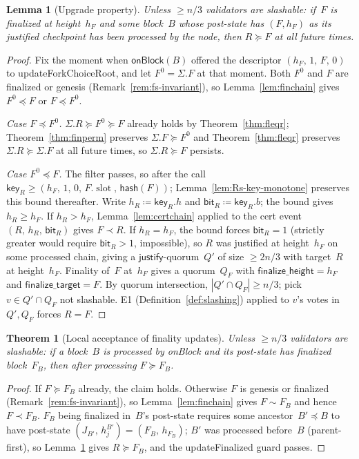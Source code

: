 \documentclass{article}
\newcommand{\slot}[0]{\ensuremath{\operatorname{\mathrm{slot}}}}
\newcommand{\just}{\ensuremath{\mathsf{justify}}\xspace}
\newcommand{\finalizeHeight}{\mathsf{finalize\_height}}
\newcommand{\finalizeTarget}{\mathsf{finalize\_target}}
\newcommand{\hash}{\mathsf{hash}}
\newcommand{\key}{\mathsf{key}}
\newcommand{\bit}{\mathsf{bit}}
\newcommand{\onBlock}{\textsf{onBlock}\xspace}
\newcommand{\updateForkChoiceRoot}{\textsf{updateForkChoiceRoot}\xspace}
\newcommand{\updateFinalized}{\textsf{updateFinalized}\xspace}
\theoremstyle{plain}
\newtheorem{theorem}{Theorem}
\newtheorem{lemma}{Lemma}
\theoremstyle{definition}
\theoremstyle{remark}
\begin{document}
\begin{lemma}[Upgrade property]\label{lem:upgrade}
Unless $\geq n/3$ validators are slashable: if~$F$ is finalized at height~$h_F$ and some block~$B$ whose post-state has $(F, h_F)$ as its justified checkpoint has been processed by the node, then $R \succeq F$ at all future times.
\end{lemma}

\begin{proof}
Fix the moment when $\onBlock(B)$ offered the descriptor $(h_F,\, 1,\, F,\, 0)$ to \updateForkChoiceRoot, and let $F^0 = \Sigma.F$ at that moment.
Both $F^0$ and $F$ are finalized or genesis (Remark~\ref{rem:fs-invariant}), so Lemma~\ref{lem:finchain} gives $F^0 \preceq F$ or $F \preceq F^0$.

\emph{Case $F \preceq F^0$.}
$\Sigma.R \succeq F^0 \succeq F$ already holds by Theorem~\ref{thm:fleqr}; Theorem~\ref{thm:finperm} preserves $\Sigma.F \succeq F^0$ and Theorem~\ref{thm:fleqr} preserves $\Sigma.R \succeq \Sigma.F$ at all future times, so $\Sigma.R \succeq F$ persists.

\emph{Case $F^0 \preceq F$.}
The filter passes, so after the call $\key_R \geq (h_F,\, 1,\, 0,\, F.\slot,\, \hash(F))$; Lemma~\ref{lem:Rs-key-monotone} preserves this bound thereafter.
Write $h_R \coloneqq \key_R.h$ and $\bit_R \coloneqq \key_R.b$; the bound gives $h_R \geq h_F$.
If $h_R > h_F$, Lemma~\ref{lem:certchain} applied to the cert event $(R,\, h_R,\, \bit_R)$ gives $F \prec R$.
If $h_R = h_F$, the bound forces $\bit_R = 1$ (strictly greater would require $\bit_R > 1$, impossible), so $R$ was justified at height~$h_F$ on some processed chain, giving a \just-quorum~$Q'$ of size $\geq 2n/3$ with target~$R$ at height~$h_F$.
Finality of~$F$ at~$h_F$ gives a quorum~$Q_F$ with $\finalizeHeight = h_F$ and $\finalizeTarget = F$.
By quorum intersection, $|Q' \cap Q_F| \geq n/3$; pick $v \in Q' \cap Q_F$ not slashable.
E1 (Definition~\ref{def:slashing}) applied to $v$'s votes in~$Q', Q_F$ forces $R = F$.
\end{proof}

\begin{theorem}[Local acceptance of finality updates]\label{thm:finlive}
Unless $\geq n/3$ validators are slashable: if a block~$B$ is processed by \onBlock and its post-state has finalized block~$F_B$, then after processing $F \succeq F_B$.
\end{theorem}

\begin{proof}
If $F \succeq F_B$ already, the claim holds.
Otherwise $F$ is genesis or finalized (Remark~\ref{rem:fs-invariant}), so Lemma~\ref{lem:finchain} gives $F \sim F_B$ and hence $F \prec F_B$.
$F_B$ being finalized in~$B$'s post-state requires some ancestor~$B' \preceq B$ to have post-state $(J_{B'},\, h_j^{B'}) = (F_B,\, h_{F_B})$; $B'$ was processed before~$B$ (parent-first), so Lemma~\ref{lem:upgrade} gives $R \succeq F_B$, and the \updateFinalized guard passes.
\end{proof}
\end{document}
